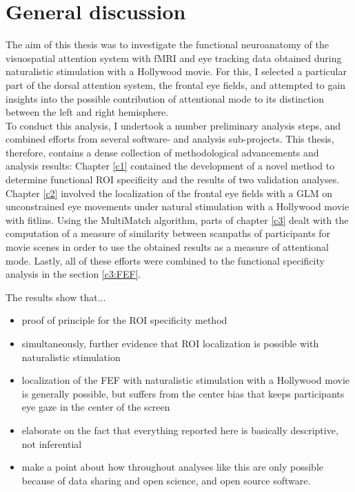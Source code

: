 \documentclass[a4paper, 12pt]{scrreprt}
\begin{document}
\chapter{General discussion}\label{section:discussion}
The aim of this thesis was to investigate the functional neuroanatomy of the visuospatial attention system with fMRI and eye tracking data obtained during naturalistic stimulation with a Hollywood movie. For this, I selected a particular part of the dorsal attention system, the frontal eye fields, and attempted to gain insights into the possible contribution of attentional mode to its distinction between the left and right hemisphere. \\
To conduct this analysis, I undertook a number preliminary analysis steps, and combined efforts from several software- and analysis sub-projects. This thesis, therefore, contains a dense collection of methodological advancements and analysis results: Chapter \ref{c1} contained the development of a novel method to determine functional ROI specificity and the results of two validation analyses. Chapter \ref{c2} involved the localization of the frontal eye fields with a GLM on unconstrained eye movements under natural stimulation with a Hollywood movie with fitlins. Using the MultiMatch algorithm, parts of chapter \ref{c3} dealt with the computation of a measure of similarity between scanpaths of participants for movie scenes in order to use the obtained results as a measure of attentional mode. Lastly, all of these efforts were combined to the functional specificity analysis in the section \ref{c3:FEF}. \\

\bigskip

 The results show that...
 \begin{itemize}
 	\item{proof of principle for the ROI specificity method}
 	\item{simultaneously, further evidence that ROI localization is possible with naturalistic stimulation}
 	\item{localization of the FEF with naturalistic stimulation with a Hollywood movie is generally possible, but suffers from the center bias that keeps participants eye gaze in the center of the screen }
 	\item elaborate on the fact that everything reported here is basically descriptive, not inferential
 	\item make a point about how throughout analyses like this are only possible because of data sharing and open science, and open source software.
 \end{itemize}
 
\end{document}
